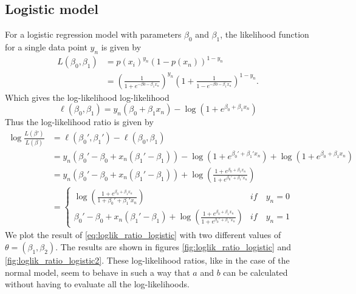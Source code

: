 \subsection{Logistic model}
For a logistic regression model with parameters $\beta_0$ and $\beta_1$, the likelihood function for a single data point $y_n$ is given by 
\begin{equation}\label{eq:logist_likelihood}
\begin{split}
    L\left(\beta_0, \beta_1\right) &= p\left(x_i\right)^{y_n} \left(1 - p\left(x_n\right)\right)^{1-y_n} \\
    &= \left(\frac{1}{1 +  e^{-\beta0 -\beta_1 x_n}}\right)^{y_n} \left(1 +  \frac{1}{1 -  e^{-\beta0 -\beta_1 x_n}}\right)^{1 - y_n}. 
\end{split}
\end{equation}
Which gives the log-likelihood log-likelihood 
\begin{equation}\label{eq:logist_loglik_example}
   \ell\left(\beta_0, \beta_1\right) =   y_n\left(\beta_0 + \beta_1 x_n \right) - \log \left( 1 + e^{\beta_0  + \beta_1 x_n }\right)
   \end{equation}
Thus the log-likelihood ratio is given by 
\begin{equation}\label{eq:loglik_ratio_logistic}
\begin{split}
    \log\frac{L\left(\beta'\right)}{L\left(\beta\right)} &= \ell\left(\beta_0', \beta_1'\right) -  \ell \left(\beta_0,\beta_1\right)\\
    & = y_n\left(\beta_0' - \beta_0 + x_n \left(\beta_1' - \beta_1\right)\right) - \log \left(1 + e^{\beta_0' + \beta_1' x_n}\right) + \log \left(1 + e^{\beta_0 +  \beta_1 x_n}\right) \\
    & = y_n\left(\beta_0' - \beta_0 + x_n\left(\beta_1' - \beta_1\right)\right) + \log \left(\frac{1 + e^{\beta_0 + \beta_1 x_n}}{1 + e^{\beta_0' + \beta_1' x_n}}\right) 
    \\
    & = \begin{cases}{} 
        \log \left(\frac{1 + e^{\beta_0 + \beta_1 x_n}}{1 + \beta_0' + \beta_1' x_n}\right) & if \quad y_n = 0 \\
        \beta_0' - \beta_0 + x_n\left(\beta_1' - \beta_1\right) + \log \left(\frac{1 + e^{\beta_0 + \beta_1 x_n}}{1 + e^{\beta_0' + \beta_1'x_n}}\right)  & if \quad y_n = 1
    \end{cases}
\end{split}
\end{equation}
We plot the result of \eqref{eq:loglik_ratio_logistic} with two different values of $\theta = \left(\beta_1,\beta_2\right)$. The results are shown in figures \ref{fig:loglik_ratio_logistic} and \ref{fig:loglik_ratio_logistic2}. These log-likelihood ratios, like in the case of the normal model, seem to behave in such a way that $a$ and $b$ can be calculated without having to evaluate all the log-likelihoods. 

